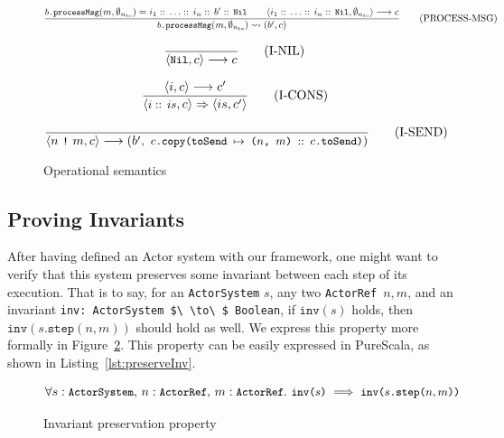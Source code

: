 \documentclass[a4paper,twoside]{article}
\newcommand{\InlineS}[1]{\lstinline[language=PureScala,basicstyle=\small\ttfamily,columns=fixed]|#1|}
\newcommand{\RefFig}[1]{Figure~\ref{#1}}
\newcommand{\RefCode}[1]{Listing~\ref{#1}}
\newcommand{\ActorRef}{\InlineS{ActorRef}\ }
\newcommand{\stt}[1]{\texttt{\small{#1}}}
\begin{document}
\begin{enumerate}
\begin{figure}[!h]
\begin{framed}
\vspace{10pt}
\begin{equation}
\dfrac{
  \stt{$b$.processMsg}(m, \emptyset_{n_{to}}) = i_1 ::\, \ldots ::\,i_n ::\, b' ::\,\stt{Nil} \qquad
  \langle i_1 ::\, \ldots ::\,i_n ::\,\stt{Nil}, \emptyset_{n_{to}} \rangle \longrightarrow c
}{
   \stt{$b$.processMsg}(m, \emptyset_{n_{to}}) \leadsto (b', c)
}
\tag{PROCESS-MSG}
\end{equation}

\vspace{10pt}
\begin{equation}
\dfrac{\empty}{
   \langle \stt{Nil}, c \rangle \longrightarrow c
}
\tag{I-NIL}
\end{equation}

\vspace{10pt}
\begin{equation}
\dfrac{
  \langle i, c \rangle \longrightarrow c'
}{
  \langle \stt{$i ::\,is$}, c \rangle \Rightarrow \langle is, c' \rangle
}
\tag{I-CONS}
\end{equation}

\vspace{10pt}
\begin{equation}
\dfrac{
  \empty
}{
  \langle n\ \stt{!}\ m, c \rangle \longrightarrow (b',\ \stt{$c$.copy(toSend $\mapsto$ ($n$, $m$) $::$ $c$.toSend)})
}
\tag{I-SEND}
\end{equation}

\end{framed}
\vspace{-10pt}
\caption{Operational semantics\label{fig:opsem}}
\end{figure}

\subsection{Proving Invariants}
\label{invariants}

After having defined an Actor system with our framework, one might want to verify that this 
system preserves some invariant between each step of its execution. That is to say, 
for an \InlineS{ActorSystem} $s$, any two \ActorRef $n, m$,
and an invariant \InlineS{inv: ActorSystem $\ \to\ $ Boolean}, if $\texttt{inv}(s)$ holds, 
then $\texttt{inv}(s\texttt{.step}(n, m))$ should hold as well. We express this 
property more formally in \RefFig{fig:stepinvariant}. This property can be easily expressed in PureScala, as shown in \RefCode{lst:preserveInv}.

\begin{figure}[!h]
$$\forall s: \stt{ActorSystem},\, n: \stt{ActorRef},\, m: \stt{ActorRef}.\ \stt{inv($s$)} \implies \stt{inv($s$.step($n, m$))}$$
\vspace{-20pt}
\caption{Invariant preservation property\label{fig:stepinvariant}}
\end{figure}


\end{enumerate}
\end{document}
